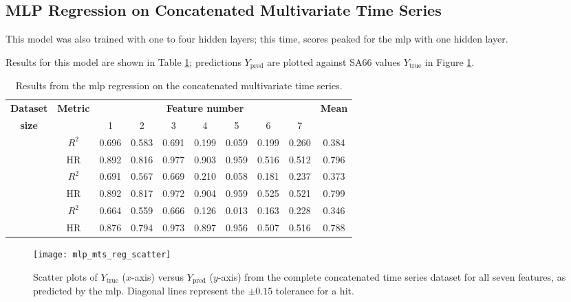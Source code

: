 \subsection{MLP Regression on Concatenated Multivariate Time Series} \label{sec:res:mlpreg:mts}
This model was also trained with one to four hidden layers; this time, scores peaked for the \ac{mlp} with one hidden layer.

Results for this model are shown in Table \ref{tab:mlpreg:mts}; predictions \(Y_{\text{pred}}\) are plotted against SA66 values \(Y_{\text{true}}\) in Figure \ref{fig:mlp_mts_reg_scatter}.

\begin{table}
    \renewcommand{\arraystretch}{1.4}
    \begin{center}
        \caption{\label{tab:mlpreg:mts} Results from the \ac{mlp} regression on the concatenated multivariate time series.}
        \begin{tabular}{ >{\bfseries}c c c c c c c c c c }
            \textbf{Dataset} & \multirow{2}{*}{\textbf{Metric}} & \multicolumn{7}{c}{\textbf{Feature number}} & \multirow{2}{*}{\textbf{Mean}} \\
            size &  & 1 & 2 & 3 & 4 & 5 & 6 & 7 \\
            \midrule
            \multirow{2}{*}{Complete}   & \(R^2\) & 0.696 & 0.583 & 0.691 & 0.199 & 0.059 & 0.199 & 0.260 & 0.384 \\
                                        & HR      & 0.892 & 0.816 & 0.977 & 0.903 & 0.959 & 0.516 & 0.512 & 0.796 \\ \cmidrule{2-10}
            \multirow{2}{*}{Reduced}    & \(R^2\) & 0.691 & 0.567 & 0.669 & 0.210 & 0.058 & 0.181 & 0.237 & 0.373 \\
                                        & HR      & 0.892 & 0.817 & 0.972 & 0.904 & 0.959 & 0.525 & 0.521 & 0.799 \\ \cmidrule{2-10}
            \multirow{2}{*}{Minimal}    & \(R^2\) & 0.664 & 0.559 & 0.666 & 0.126 & 0.013 & 0.163 & 0.228 & 0.346 \\
                                        & HR      & 0.876 & 0.794 & 0.973 & 0.897 & 0.956 & 0.507 & 0.516 & 0.788 \\
        \end{tabular}
    \end{center}
\end{table}

\begin{figure}[tb!]
    \centering
    \texttt{[image: mlp\_mts\_reg\_scatter]}
    \caption{\label{fig:mlp_mts_reg_scatter} Scatter plots of \(Y_\text{true}\) (\(x\)-axis) versus \(Y_\text{pred}\) (\(y\)-axis) from the complete concatenated time series dataset for all seven features, as predicted by the \ac{mlp}. Diagonal lines represent the \(\pm0.15\) tolerance for a hit.}
\end{figure}

